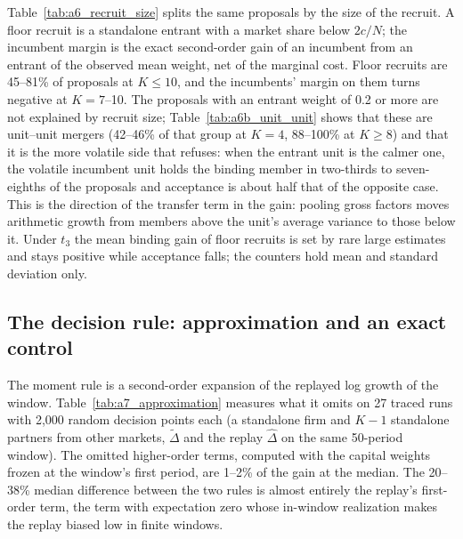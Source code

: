 Table~\ref{tab:a6_recruit_size} splits the same proposals by the size of the recruit. A floor recruit is a standalone entrant with a market share below $2c/N$; the incumbent margin is the exact second-order gain of an incumbent from an entrant of the observed mean weight, net of the marginal cost. Floor recruits are 45--81\% of proposals at $K \leq 10$, and the incumbents' margin on them turns negative at $K = 7$--10. The proposals with an entrant weight of 0.2 or more are not explained by recruit size; Table~\ref{tab:a6b_unit_unit} shows that these are unit--unit mergers (42--46\% of that group at $K = 4$, 88--100\% at $K \geq 8$) and that it is the more volatile side that refuses: when the entrant unit is the calmer one, the volatile incumbent unit holds the binding member in two-thirds to seven-eighths of the proposals and acceptance is about half that of the opposite case. This is the direction of the transfer term in the gain: pooling gross factors moves arithmetic growth from members above the unit's average variance to those below it. Under $t_3$ the mean binding gain of floor recruits is set by rare large estimates and stays positive while acceptance falls; the counters hold mean and standard deviation only.





\subsection{The decision rule: approximation and an exact control}\label{app:rule}

The moment rule is a second-order expansion of the replayed log growth of the window. Table~\ref{tab:a7_approximation} measures what it omits on 27 traced runs with 2,000 random decision points each (a standalone firm and $K - 1$ standalone partners from other markets, $\tilde\Delta$ and the replay $\hat\Delta$ on the same 50-period window). The omitted higher-order terms, computed with the capital weights frozen at the window's first period, are 1--2\% of the gain at the median. The 20--38\% median difference between the two rules is almost entirely the replay's first-order term, the term with expectation zero whose in-window realization makes the replay biased low in finite windows.

